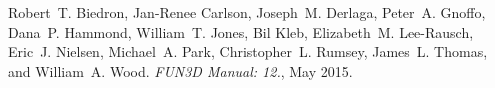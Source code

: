 
\begin{DoxyDescription}
\item[\label{citelist_CITEREF_FUN3D}%
\Hypertarget{citelist_CITEREF_FUN3D}%
\mbox{[}1\mbox{]}]Robert~T. Biedron, Jan-\/\+Renee Carlson, Joseph~M. Derlaga, Peter~A. Gnoffo, Dana~P. Hammond, William~T. Jones, Bil Kleb, Elizabeth~M. Lee-\/\+Rausch, Eric~J. Nielsen, Michael~A. Park, Christopher~L. Rumsey, James~L. Thomas, and William~A. Wood. {\itshape FUN3D Manual\+: 12.}, May 2015.


\end{DoxyDescription}